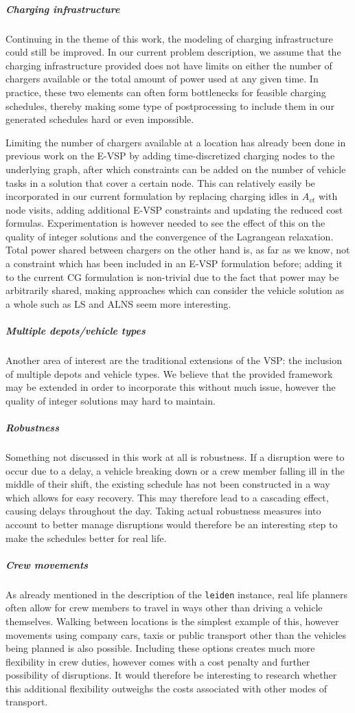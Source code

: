 \documentclass[]{article}
\begin{document}
\subparagraph{Charging infrastructure}
Continuing in the theme of this work, the modeling of charging infrastructure could still be improved. In our current problem description, we assume that the charging infrastructure provided does not have limits on either the number of chargers available or the total amount of power used at any given time. In practice, these two elements can often form bottlenecks for feasible charging schedules, thereby making some type of postprocessing to include them in our generated schedules hard or even impossible. 

Limiting the number of chargers available at a location has already been done in previous work on the E-VSP by adding time-discretized charging nodes to the underlying graph, after which constraints can be added on the number of vehicle tasks in a solution that cover a certain node. This can relatively easily be incorporated in our current formulation by replacing charging idles in $A_{vt}$ with node visits, adding additional E-VSP constraints and updating the reduced cost formulas. Experimentation is however needed to see the effect of this on the quality of integer solutions and the convergence of the Lagrangean relaxation. Total power shared between chargers on the other hand is, as far as we know, not a constraint which has been included in an E-VSP formulation before; adding it to the current CG formulation is non-trivial due to the fact that power may be arbitrarily shared, making approaches which can consider the vehicle solution as a whole such as LS and ALNS seem more interesting. 

\subparagraph{Multiple depots/vehicle types}
Another area of interest are the traditional extensions of the VSP: the inclusion of multiple depots and vehicle types. We believe that the provided framework may be extended in order to incorporate this without much issue, however the quality of integer solutions may hard to maintain. 

\subparagraph{Robustness}
Something not discussed in this work at all is robustness. If a disruption were to occur due to a delay, a vehicle breaking down or a crew member falling ill in the middle of their shift, the existing schedule has not been constructed in a way which allows for easy recovery. This may therefore lead to a cascading effect, causing delays throughout the day. Taking actual robustness measures into account to better manage disruptions would therefore be an interesting step to make the schedules better for real life.

\subparagraph{Crew movements}
As already mentioned in the description of the \texttt{leiden} instance, real life planners often allow for crew members to travel in ways other than driving a vehicle themselves. Walking between locations is the simplest example of this, however movements using company cars, taxis or public transport other than the vehicles being planned is also possible. Including these options creates much more flexibility in crew duties, however comes with a cost penalty and further possibility of disruptions. It would therefore be interesting to research whether this additional flexibility outweighs the costs associated with other modes of transport.  
\end{document}

